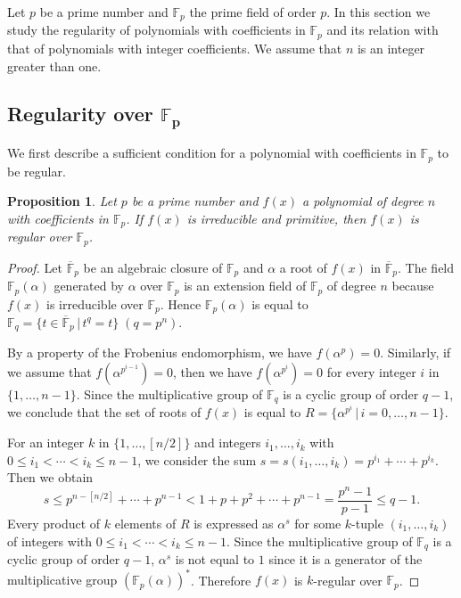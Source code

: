 \documentclass{amsart}
\theoremstyle{plain}
\newtheorem{prop}[thm]{Proposition}
\theoremstyle{definition}
\theoremstyle{remark}
\newcommand{\cb}{}
\begin{document}

Let $p$ be a prime number and $\mathbb{F}_p$ the prime field of order $p$. 
In this section we study the regularity of polynomials with coefficients in $\mathbb{F}_p$ 
and its relation with that of polynomials with integer coefficients. 
We assume that $n$ is an integer greater than one. 

\subsection{Regularity over $\boldsymbol{\mathbb{F}_p}$}

We first describe a sufficient condition for a polynomial with coefficients in $\mathbb{F}_p$ to be regular. 

\begin{prop}\label{reg_p}
Let $p$ be a prime number and $f(x)$ a polynomial of degree $n$ with coefficients in $\mathbb{F}_p$. 
If $f(x)$ is irreducible
{\cb and primitive},
then $f(x)$ is regular over $\mathbb{F}_p$.
\end{prop}

\begin{proof}
Let $\overline{\mathbb{F}}_p$ be an algebraic closure of $\mathbb{F}_p$ and 
$\alpha$ a root of $f(x)$ in $\overline{\mathbb{F}}_p$. 
The field $\mathbb{F}_p(\alpha)$ generated by $\alpha$ over $\mathbb{F}_p$ is 
an extension field of $\mathbb{F}_p$ of degree $n$ because $f(x)$ is irreducible over $\mathbb{F}_p$. 
Hence $\mathbb{F}_p(\alpha)$ is equal to 
$\mathbb{F}_q=\{t\in\overline{\mathbb{F}}_p\, |\, t^q=t\}\; (q=p^n)$. 

By a property of the Frobenius endomorphism, we have $f(\alpha^p)=0$. 
Similarly, if we assume that $f(\alpha^{p^{i-1}})=0$, then we have $f(\alpha^{p^{i}})=0$ 
for every integer $i$ in $\{1,\ldots ,n-1\}$. Since the multiplicative group of $\mathbb{F}_q$ is 
a cyclic group of order $q-1$, we conclude that the set of roots of $f(x)$ is equal to 
$R=\{\alpha^{p^i}\, |\, i=0,\ldots ,n-1\}$. 

For an integer $k$ in $\{1,\ldots ,[n/2]\}$ and integers 
$i_1,\ldots ,i_k$ with $0\leq i_1<\cdots <i_k\leq n-1$, 
we consider the sum $s=s(i_1,\ldots ,i_k)=p^{i_1}+\cdots +p^{i_k}$. Then we obtain 
\[
s\leq p^{n-[n/2]}+\cdots +p^{n-1}<1+p+p^2+\cdots +p^{n-1}=\frac{p^n-1}{p-1}\leq q-1.
\]
Every product of $k$ elements of $R$ is expressed as $\alpha^s$ for some $k$-tuple 
$(i_1,\ldots ,i_k)$ of integers with $0\leq i_1<\cdots <i_k\leq n-1$. 
Since the multiplicative group of $\mathbb{F}_q$ is a cyclic group of order $q-1$, 
$\alpha^s$ is not equal to $1$
{\cb since it is a generator of the multiplicative group  $(\mathbb{F}_p(\alpha))^*$}.
Therefore $f(x)$ is $k$-regular over $\mathbb{F}_p$. 
\end{proof}
\end{document}
